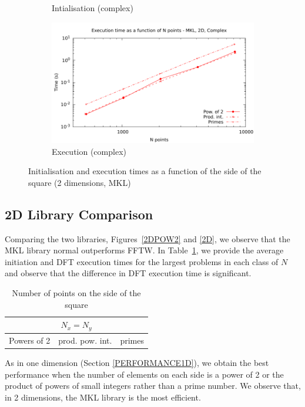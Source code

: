 \documentclass[12pt, a4paper]{article}
\begin{document}
\begin{figure}[H]
\begin{subfigure}{.5\textwidth}
\caption{Intialisation (complex)}
\label{2DMKLCI}
\end{subfigure}%
\begin{subfigure}{.5\textwidth}
\centering
\includegraphics[width=.9\linewidth]{graphs/2d-mkl-exec-c.pdf}
\caption{Execution (complex)}
\label{2DMKLC}
\end{subfigure}
\caption{Initialisation and execution times as a function of the side of the square (2 dimensions, MKL)}
\label{2DMKL}
\end{figure}






\subsection{2D Library Comparison}
Comparing the two libraries, Figures~\ref{2DPOW2} and \ref{2D}, we observe that the MKL library normal outperforms FFTW. In Table~\ref{Tbl:2D}, we provide the average initiation and DFT execution times for the largest problems in each class of $N$ and observe that the difference in DFT execution time is significant.


\begin{table}[H]
\captionsetup{width=0.8\linewidth}
\centering
\begin{tabular}{|l|l|l|}
  \hline
  \multicolumn{3}{|c|}{$N_x=N_y$}\\
  \hline
  \hline
   Powers of 2 & prod. pow. int. & primes\\ \hline


\end{tabular}
\caption{Number of points on the side of the square}\label{Tbl:2D}
\end{table}


As in one dimension (Section \ref{PERFORMANCE1D}), we obtain the best performance when the number of elements on each side is a power of 2 or the product of powers of small integers rather than a prime number. We observe that, in 2 dimensions, the MKL library is the most efficient.
\end{document}
